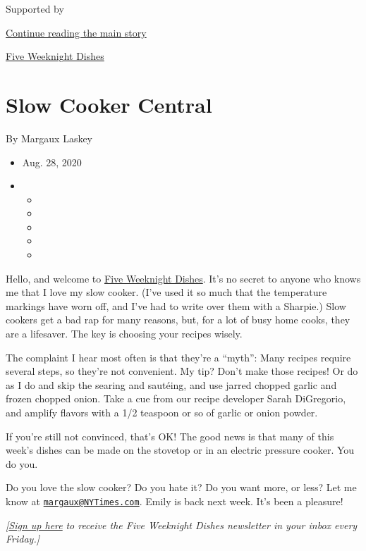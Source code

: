 Supported by

\protect\hyperlink{after-sponsor}{Continue reading the main story}

\href{/column/five-weeknight-dishes}{Five Weeknight Dishes}

\hypertarget{slow-cooker-central}{%
\section{Slow Cooker Central}\label{slow-cooker-central}}

By Margaux Laskey

\begin{itemize}
\item
  Aug. 28, 2020
\item
  \begin{itemize}
  \item
  \item
  \item
  \item
  \item
  \end{itemize}
\end{itemize}

Hello, and welcome to
\href{https://www.nytimes3xbfgragh.onion/column/five-weeknight-dishes}{Five
Weeknight Dishes}. It's no secret to anyone who knows me that I love my
slow cooker. (I've used it so much that the temperature markings have
worn off, and I've had to write over them with a Sharpie.) Slow cookers
get a bad rap for many reasons, but, for a lot of busy home cooks, they
are a lifesaver. The key is choosing your recipes wisely.

The complaint I hear most often is that they're a ``myth'': Many recipes
require several steps, so they're not convenient. My tip? Don't make
those recipes! Or do as I do and skip the searing and sautéing, and use
jarred chopped garlic and frozen chopped onion. Take a cue from our
recipe developer Sarah DiGregorio, and amplify flavors with a 1/2
teaspoon or so of garlic or onion powder.

If you're still not convinced, that's OK! The good news is that many of
this week's dishes can be made on the stovetop or in an electric
pressure cooker. You do you.

Do you love the slow cooker? Do you hate it? Do you want more, or less?
Let me know at
\href{mailto:margaux@NYTimes.com}{\nolinkurl{margaux@NYTimes.com}}.
Emily is back next week. It's been a pleasure!

\emph{{[}\href{https://www.nytimes3xbfgragh.onion/newsletters/five-weeknight-dishes?module=inline}{Sign
up here}} \emph{to receive the Five Weeknight Dishes newsletter in your
inbox every Friday.{]}}

